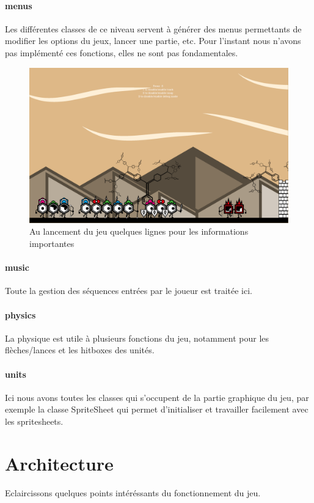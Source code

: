 \documentclass[a4paper,10pt]{article}
\begin{document}
  \paragraph{menus}
  Les différentes classes de ce niveau servent à générer des menus permettants de modifier les options du jeux, lancer une partie, etc. Pour l'instant nous n'avons pas implémenté ces fonctions, elles ne sont pas fondamentales.
  \begin{figure}[!h]
 \centering
 \vspace{-10pt}
 \includegraphics[scale=0.2]{images/menu}
 \caption{Au lancement du jeu quelques lignes pour les informations importantes}
 \end{figure}
  \paragraph{music}
  Toute la gestion des séquences entrées par le joueur est traitée ici.
  \paragraph{physics}
  La physique est utile à plusieurs fonctions du jeu, notamment pour les flèches/lances et les hitboxes des unités.
  \paragraph{units}
  Ici nous avons toutes les classes qui s'occupent de la partie graphique du jeu, par exemple la classe SpriteSheet qui permet d'initialiser et travailler facilement avec les spritesheets.
  
  \pagebreak 
  \section{Architecture}
  Eclaircissons quelques points intéréssants du fonctionnement du jeu.
\end{document}
